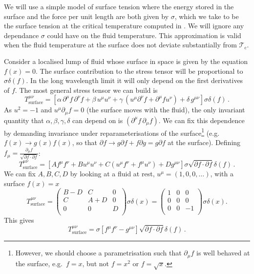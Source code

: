 \documentclass[12pt,a4paper]{article}
\newcommand{\ra}{\rightarrow}
\newcommand{\cdt}{\!\cdot\!}
\newcommand{\prn}[1]{\left ( #1 \right )}
\newcommand{\brk}[1]{\left [ #1 \right ]}
\newcommand{\p}{\partial}
\newcommand{\tc}{\mathcal{T_\mathrm{c}}}
\begin{document}
We will use a simple model of surface tension where the energy
stored in the surface and the force per unit length are both given
by $\sigma$, which we take to be the surface tension at the critical
temperature computed in \cite{Aharony:2005bm}. We will ignore any
dependance $\sigma$ could have on the fluid temperature. This
approximation is valid when the fluid temperature at the surface
does not deviate substantially from $\tc$.

Consider a localised lump of fluid whose surface in space is given
by the equation $f(x)=0$. The surface contribution to the stress
tensor will be proportional to $\sigma\delta(f)$. In the long
wavelength limit it will only depend on the first derivatives of
$f$. The most general stress tensor we can build is
%
\begin{equation*}
  T^{\mu\nu}_\mathrm{surface} = \brk{\alpha\, \p^\mu\! f\, \p^\nu\! f
                   +\beta\, u^\mu u^\nu
                   +\gamma\, (u^\mu\p^\nu\! f + \p^\mu\! fu^\nu)
                   +\delta\, g^{\mu\nu}}\sigma\delta(f)\,.
\end{equation*}
%
As $u^2=-1$ and $u^\mu\p_\mu f = 0$ (the surface moves with the
fluid), the only invariant quantity that
$\alpha,\beta,\gamma,\delta$ can depend on is $(\p^\mu\! f\, \p_\mu
f)$. We can fix this dependence by demanding invariance under
reparameterisations of the surface\footnote{However, we should
choose a parametrisation such that $\p_\mu f$ is well behaved at the
surface, e.g.\ $f=x$, but not $f=x^2$ or $f=\sqrt{x}$.} (e.g.
$f(x)\ra g(x)f(x)$, so that $\p f\ra g\p f + f\p g = g\p f$ at the
surface). Defining $f_\mu = \frac{\p_\mu f}{\sqrt{\p f\cdt\p f}}$:
%
\begin{equation*}
    T^{\mu\nu}_\mathrm{surface} = \brk{A f^\mu f^\nu
                   +B u^\mu u^\nu
                   +C \prn{u^\mu f^\nu + f^\mu u^\nu}
                   +D g^{\mu\nu}}\sigma\sqrt{\p f\cdt\p f}\delta(f)\,.
\end{equation*}
%
We can fix $A,B,C,D$ by looking at a fluid at rest, $u^\mu =
(1,0,0,\ldots)$, with a surface $f(x)=x$
%
\begin{equation*}
  T^{\mu\nu}_\mathrm{surface} =
  \begin{pmatrix}
    B-D & C   & 0  \\
    C   & A+D & 0  \\
    0   & 0   & D  \\
  \end{pmatrix}
     \sigma\delta(x)=
  \begin{pmatrix}
    1 & 0 &  0   \\
    0 & 0 &  0   \\
    0 & 0 & -1   \\
  \end{pmatrix}
     \sigma\delta(x).
\end{equation*}
%
This gives
%
\begin{equation}\label{srfStr:eq}
  T^{\mu\nu}_\mathrm{surface} = \sigma\brk{f^\mu f^\nu - g^{\mu\nu}}
               \sqrt{\p f\cdt\p f}\delta(f)\,.
\end{equation}
%
\end{document}
